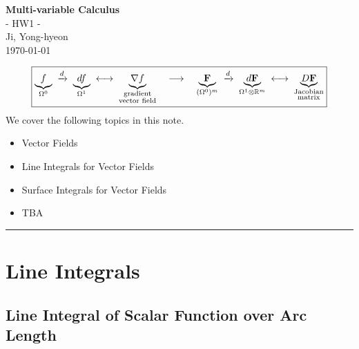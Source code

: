 \documentclass[11pt,openany]{article}
\begin{document}
\begin{center}
	\huge\textbf{Multi-variable Calculus}\\
	\Large - HW1 -\\
	\vspace{0.5em}
	\large{Ji, Yong-hyeon}\\
	\vspace{0.5em}
	\normalsize{\today}\\
\end{center} \[\boxed{
\underbrace{f}_{\Omega^0}
\;\xrightarrow{d}\;
\underbrace{df}_{\Omega^1}
\;\longleftrightarrow\;
\underbrace{\nabla f}_{\substack{\text{gradient}\\\text{vector field}}}
\quad
\longrightarrow
\quad
\underbrace{\mathbf F}_{(\Omega^0)^m}
\;\xrightarrow{d}\;
\underbrace{d\mathbf F}_{\Omega^1\otimes\mathbb{R}^m}
\;\longleftrightarrow\;
\underbrace{D\mathbf F}_{\substack{\text{Jacobian}\\\text{matrix}}}}
\]
\noindent 
We cover the following topics in this note.
\begin{itemize}
	\item Vector Fields
	\item Line Integrals for Vector Fields
	\item Surface Integrals for Vector Fields
	\item TBA
\end{itemize}
\hrule\vspace{12pt}
\tableofcontents

\newpage
\section*{Line Integrals}
\subsection*{Line Integral of Scalar Function over Arc Length}
\end{document}
